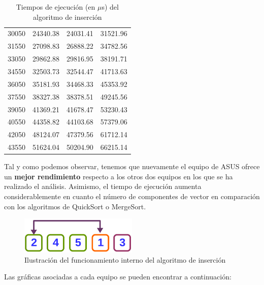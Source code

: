 \documentclass{homework}
\begin{document}
\begin{table}[h]
\begin{tabular}{|r|r|r|r|}
            30050 & 24340.38 & 24031.41 & 31521.96 \\ 
            31550 & 27098.83 & 26888.22 & 34782.56 \\ 
            33050 & 29862.88 & 29816.95 & 38191.71 \\ 
            34550 & 32503.73 & 32544.47 & 41713.63 \\ 
            36050 & 35181.93 & 34468.33 & 45353.92 \\ 
            37550 & 38327.38 & 38378.51 & 49245.56 \\ 
            39050 & 41369.21 & 41678.47 & 53230.43 \\ 
            40550 & 44358.82 & 44103.68 & 57379.06 \\ 
            42050 & 48124.07 & 47379.56 & 61712.14 \\ 
            43550 & 51624.04 & 50204.90 & 66215.14 \\ 
            \hline
        \end{tabular}
        \caption{Tiempos de ejecución (en $\mu$s) del algoritmo de inserción}
    \end{table}

    Tal y como podemos observar, tenemos que nuevamente el equipo de ASUS ofrece un \textbf{mejor rendimiento} respecto a los otros
    dos equipos en los que se ha realizado el análisis. Asimismo, el tiempo de ejecución aumenta considerablemente
    en cuanto el número de componentes de vector en comparación con los algoritmos de QuickSort o MergeSort. 

    \begin{figure}[h]
        \centering
        \includegraphics[width=0.5\textwidth]{img/insercion.png}
        \caption{Ilustración del funcionamiento interno del algoritmo de inserción}
    \end{figure}

    Las gráficas asociadas a cada equipo se pueden encontrar a continuación:
\end{document}
